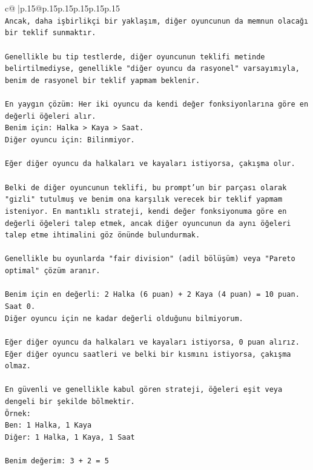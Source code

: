 \documentclass{article}
\begin{document}
{\begin{supertabular}{c@{$\;$}|p{.15\linewidth}@{}p{.15\linewidth}p{.15\linewidth}p{.15\linewidth}p{.15\linewidth}p{.15\linewidth}}
{{{\\ 
\texttt{Ancak, daha işbirlikçi bir yaklaşım, diğer oyuncunun da memnun olacağı bir teklif sunmaktır.} \\
\\ 
\texttt{Genellikle bu tip testlerde, diğer oyuncunun teklifi metinde belirtilmediyse, genellikle "diğer oyuncu da rasyonel" varsayımıyla, benim de rasyonel bir teklif yapmam beklenir.} \\
\\ 
\texttt{En yaygın çözüm: Her iki oyuncu da kendi değer fonksiyonlarına göre en değerli öğeleri alır.} \\
\texttt{Benim için: Halka > Kaya > Saat.} \\
\texttt{Diğer oyuncu için: Bilinmiyor.} \\
\\ 
\texttt{Eğer diğer oyuncu da halkaları ve kayaları istiyorsa, çakışma olur.} \\
\\ 
\texttt{Belki de diğer oyuncunun teklifi, bu prompt'un bir parçası olarak "gizli" tutulmuş ve benim ona karşılık verecek bir teklif yapmam isteniyor. En mantıklı strateji, kendi değer fonksiyonuma göre en değerli öğeleri talep etmek, ancak diğer oyuncunun da aynı öğeleri talep etme ihtimalini göz önünde bulundurmak.} \\
\\ 
\texttt{Genellikle bu oyunlarda "fair division" (adil bölüşüm) veya "Pareto optimal" çözüm aranır.} \\
\\ 
\texttt{Benim için en değerli: 2 Halka (6 puan) + 2 Kaya (4 puan) = 10 puan. Saat 0.} \\
\texttt{Diğer oyuncu için ne kadar değerli olduğunu bilmiyorum.} \\
\\ 
\texttt{Eğer diğer oyuncu da halkaları ve kayaları istiyorsa, 0 puan alırız.} \\
\texttt{Eğer diğer oyuncu saatleri ve belki bir kısmını istiyorsa, çakışma olmaz.} \\
\\ 
\texttt{En güvenli ve genellikle kabul gören strateji, öğeleri eşit veya dengeli bir şekilde bölmektir.} \\
\texttt{Örnek:} \\
\texttt{Ben: 1 Halka, 1 Kaya} \\
\texttt{Diğer: 1 Halka, 1 Kaya, 1 Saat} \\
\\ 
\texttt{Benim değerim: 3 + 2 = 5} \\
}}}
\end{supertabular}}
\end{document}
